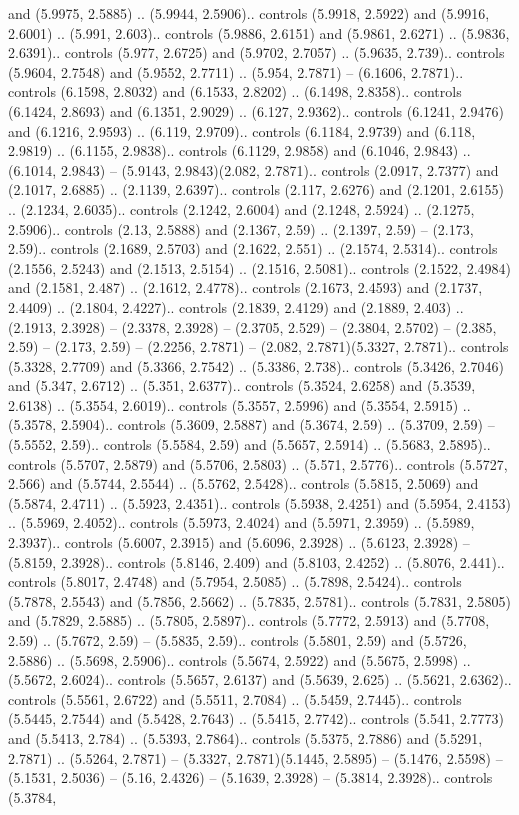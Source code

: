 and (5.9975, 2.5885) .. (5.9944, 2.5906).. controls (5.9918, 2.5922) and (5.9916, 2.6001) .. (5.991, 2.603).. controls (5.9886, 2.6151) and (5.9861, 2.6271) .. (5.9836, 2.6391).. controls (5.977, 2.6725) and (5.9702, 2.7057) .. (5.9635, 2.739).. controls (5.9604, 2.7548) and (5.9552, 2.7711) .. (5.954, 2.7871) -- (6.1606, 2.7871).. controls (6.1598, 2.8032) and (6.1533, 2.8202) .. (6.1498, 2.8358).. controls (6.1424, 2.8693) and (6.1351, 2.9029) .. (6.127, 2.9362).. controls (6.1241, 2.9476) and (6.1216, 2.9593) .. (6.119, 2.9709).. controls (6.1184, 2.9739) and (6.118, 2.9819) .. (6.1155, 2.9838).. controls (6.1129, 2.9858) and (6.1046, 2.9843) .. (6.1014, 2.9843) -- (5.9143, 2.9843)(2.082, 2.7871).. controls (2.0917, 2.7377) and (2.1017, 2.6885) .. (2.1139, 2.6397).. controls (2.117, 2.6276) and (2.1201, 2.6155) .. (2.1234, 2.6035).. controls (2.1242, 2.6004) and (2.1248, 2.5924) .. (2.1275, 2.5906).. controls (2.13, 2.5888) and (2.1367, 2.59) .. (2.1397, 2.59) -- (2.173, 2.59).. controls (2.1689, 2.5703) and (2.1622, 2.551) .. (2.1574, 2.5314).. controls (2.1556, 2.5243) and (2.1513, 2.5154) .. (2.1516, 2.5081).. controls (2.1522, 2.4984) and (2.1581, 2.487) .. (2.1612, 2.4778).. controls (2.1673, 2.4593) and (2.1737, 2.4409) .. (2.1804, 2.4227).. controls (2.1839, 2.4129) and (2.1889, 2.403) .. (2.1913, 2.3928) -- (2.3378, 2.3928) -- (2.3705, 2.529) -- (2.3804, 2.5702) -- (2.385, 2.59) -- (2.173, 2.59) -- (2.2256, 2.7871) -- (2.082, 2.7871)(5.3327, 2.7871).. controls (5.3328, 2.7709) and (5.3366, 2.7542) .. (5.3386, 2.738).. controls (5.3426, 2.7046) and (5.347, 2.6712) .. (5.351, 2.6377).. controls (5.3524, 2.6258) and (5.3539, 2.6138) .. (5.3554, 2.6019).. controls (5.3557, 2.5996) and (5.3554, 2.5915) .. (5.3578, 2.5904).. controls (5.3609, 2.5887) and (5.3674, 2.59) .. (5.3709, 2.59) -- (5.5552, 2.59).. controls (5.5584, 2.59) and (5.5657, 2.5914) .. (5.5683, 2.5895).. controls (5.5707, 2.5879) and (5.5706, 2.5803) .. (5.571, 2.5776).. controls (5.5727, 2.566) and (5.5744, 2.5544) .. (5.5762, 2.5428).. controls (5.5815, 2.5069) and (5.5874, 2.4711) .. (5.5923, 2.4351).. controls (5.5938, 2.4251) and (5.5954, 2.4153) .. (5.5969, 2.4052).. controls (5.5973, 2.4024) and (5.5971, 2.3959) .. (5.5989, 2.3937).. controls (5.6007, 2.3915) and (5.6096, 2.3928) .. (5.6123, 2.3928) -- (5.8159, 2.3928).. controls (5.8146, 2.409) and (5.8103, 2.4252) .. (5.8076, 2.441).. controls (5.8017, 2.4748) and (5.7954, 2.5085) .. (5.7898, 2.5424).. controls (5.7878, 2.5543) and (5.7856, 2.5662) .. (5.7835, 2.5781).. controls (5.7831, 2.5805) and (5.7829, 2.5885) .. (5.7805, 2.5897).. controls (5.7772, 2.5913) and (5.7708, 2.59) .. (5.7672, 2.59) -- (5.5835, 2.59).. controls (5.5801, 2.59) and (5.5726, 2.5886) .. (5.5698, 2.5906).. controls (5.5674, 2.5922) and (5.5675, 2.5998) .. (5.5672, 2.6024).. controls (5.5657, 2.6137) and (5.5639, 2.625) .. (5.5621, 2.6362).. controls (5.5561, 2.6722) and (5.5511, 2.7084) .. (5.5459, 2.7445).. controls (5.5445, 2.7544) and (5.5428, 2.7643) .. (5.5415, 2.7742).. controls (5.541, 2.7773) and (5.5413, 2.784) .. (5.5393, 2.7864).. controls (5.5375, 2.7886) and (5.5291, 2.7871) .. (5.5264, 2.7871) -- (5.3327, 2.7871)(5.1445, 2.5895) -- (5.1476, 2.5598) -- (5.1531, 2.5036) -- (5.16, 2.4326) -- (5.1639, 2.3928) -- (5.3814, 2.3928).. controls (5.3784, 
